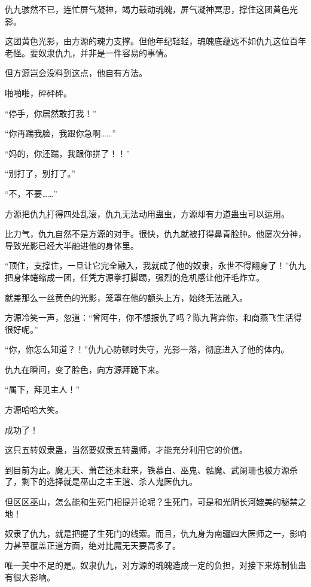 
\begin{this_body}

仇九骇然不已，连忙屏气凝神，竭力鼓动魂魄，屏气凝神冥思，撑住这团黄色光影。

这团黄色光影，由方源的魂力支撑。但他年纪轻轻，魂魄底蕴远不如仇九这位百年老怪。要奴隶仇九，并非是一件容易的事情。

但方源岂会没料到这点，他自有方法。

啪啪啪，砰砰砰。

“停手，你居然敢打我！”

“你再踹我脸，我跟你急啊……”

“妈的，你还踹，我跟你拼了！！”

“别打了，别打了。”

“不，不要……”

方源把仇九打得四处乱滚，仇九无法动用蛊虫，方源却有力道蛊虫可以运用。

比力气，仇九自然不是方源的对手。很快，仇九就被打得鼻青脸肿。他屡次分神，导致光影已经大半融进他的身体里。

“顶住，支撑住，一旦让它完全融入，我就成了他的奴隶，永世不得翻身了！”仇九把身体蜷缩成一团，任凭方源拳打脚踢，强烈的危机感让他汗毛炸立。

就差那么一丝黄色的光影，笼罩在他的额头上方，始终无法融入。

方源冷笑一声，忽道：“曾阿牛，你不想报仇了吗？陈九背弃你，和商燕飞生活得很好呢。”

“你，你怎么知道？！”仇九心防顿时失守，光影一落，彻底进入了他的体内。

仇九在瞬间，变了脸色，向方源拜跪下来。

“属下，拜见主人！”

方源哈哈大笑。

成功了！

这只五转奴隶蛊，当然要奴隶五转蛊师，才能充分利用它的价值。

到目前为止。魔无天、萧芒还未赶来，铁慕白、巫鬼、骷魔、武阑珊也被方源杀了，剩下的选择就是巫山之主王逍、杀人鬼医仇九。

但区区巫山，怎么能和生死门相提并论呢？生死门，可是和光阴长河媲美的秘禁之地！

奴隶了仇九，就是把握了生死门的线索。而且，仇九身为南疆四大医师之一，影响力甚至覆盖正道方面，绝对比魔无天要高多了。

唯一美中不足的是。奴隶仇九，对方源的魂魄造成一定的负担，对接下来炼制仙蛊有很大影响。


\end{this_body}
